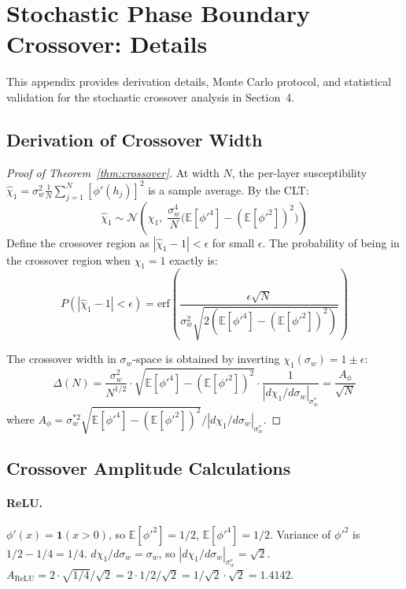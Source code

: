 \documentclass[10pt]{article}
\newcommand{\EE}{\mathbb{E}}
\begin{document}
\section{Stochastic Phase Boundary Crossover: Details}
\label{app:crossover-detail}

This appendix provides derivation details, Monte Carlo protocol, and statistical validation for the stochastic crossover analysis in Section~4.

\subsection{Derivation of Crossover Width}

\begin{proof}[Proof of Theorem~\ref{thm:crossover}]
At width $N$, the per-layer susceptibility $\hat{\chi}_1 = \sigma_w^2 \frac{1}{N}\sum_{j=1}^N [\phi'(h_j)]^2$ is a sample average.
By the CLT:
\begin{equation}
    \hat{\chi}_1 \sim \mathcal{N}\!\left(\chi_1,\; \frac{\sigma_w^4}{N}\bigl(\EE[\phi'^4] - (\EE[\phi'^2])^2\bigr)\right)
\end{equation}
Define the crossover region as $|\hat{\chi}_1 - 1| < \epsilon$ for small $\epsilon$.
The probability of being in the crossover region when $\chi_1 = 1$ exactly is:
\begin{equation}
    P(|\hat{\chi}_1 - 1| < \epsilon) = \text{erf}\!\left(\frac{\epsilon\sqrt{N}}{\sigma_w^2\sqrt{2(\EE[\phi'^4] - (\EE[\phi'^2])^2)}}\right)
\end{equation}

The crossover width in $\sigma_w$-space is obtained by inverting $\chi_1(\sigma_w) = 1 \pm \epsilon$:
\begin{equation}
    \Delta(N) = \frac{\sigma_w^2}{N^{1/2}} \cdot \sqrt{\EE[\phi'^4] - (\EE[\phi'^2])^2} \cdot \frac{1}{|d\chi_1/d\sigma_w|_{\sigma_w^*}} = \frac{A_\phi}{\sqrt{N}}
\end{equation}
where $A_\phi = \sigma_w^{*2} \sqrt{\EE[\phi'^4] - (\EE[\phi'^2])^2} / |d\chi_1/d\sigma_w|_{\sigma_w^*}$.
\end{proof}

\subsection{Crossover Amplitude Calculations}

\paragraph{ReLU.}
$\phi'(x) = \mathbf{1}(x > 0)$, so $\EE[\phi'^2] = 1/2$, $\EE[\phi'^4] = 1/2$.
Variance of $\phi'^2$ is $1/2 - 1/4 = 1/4$.
$d\chi_1/d\sigma_w = \sigma_w$, so $|d\chi_1/d\sigma_w|_{\sigma_w^*} = \sqrt{2}$.
$A_{\text{ReLU}} = 2 \cdot \sqrt{1/4} / \sqrt{2} = 2 \cdot 1/2 / \sqrt{2} = 1/\sqrt{2} \cdot \sqrt{2} = 1.4142$.
\end{document}
